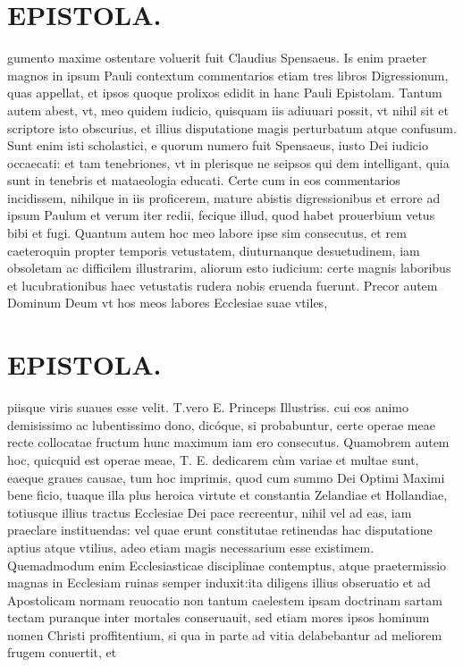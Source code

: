 \documentclass{article}
\begin{document}
\begin{pages}
\section*{EPISTOLA. }\pstart gumento maxime ostentare voluerit fuit Claudius Spensaeus. Is enim praeter magnos in ipsum Pauli contextum commentarios etiam tres libros Digressionum, quas appellat, et ipsos quoque prolixos edidit in hanc Pauli Epistolam. Tantum autem abest, vt, meo quidem iudicio, quisquam iis adiuuari possit, vt nihil sit et scriptore isto obscurius, et illius disputatione magis perturbatum atque confusum. Sunt enim isti scholastici, e quorum numero fuit Spensaeus, iusto Dei iudicio occaecati: et tam tenebriones, vt in plerisque ne seipsos qui dem intelligant, quia sunt in tenebris et mataeologia educati. Certe cum in eos commentarios incidissem, nihilque in iis proficerem, mature abistis digressionibus et errore ad ipsum Paulum et verum iter redii, fecique illud, quod habet prouerbium vetus bibi et fugi. Quantum autem hoc meo labore ipse sim consecutus, et rem caeteroquin propter temporis vetustatem, diuturnanque desuetudinem, iam obsoletam ac difficilem illustrarim, aliorum esto iudicium: certe magnis laboribus et lucubrationibus haec vetustatis rudera nobis eruenda fuerunt. Precor autem Dominum Deum vt hos meos labores Ecclesiae suae vtiles,  \pend
\section*{EPISTOLA. }\pstart piisque viris suaues esse velit. T.vero E. Princeps Illustriss. cui eos animo demisissimo ac lubentissimo dono, dicóque, si probabuntur, certe operae meae recte collocatae fructum hunc maximum iam ero consecutus. Quamobrem autem hoc, quicquid est operae meae, T. E. dedicarem cùm variae et multae sunt, eaeque graues causae, tum hoc imprimis, quod cum summo Dei Optimi Maximi bene ficio, tuaque illa plus heroica virtute et constantia Zelandiae et Hollandiae, totiusque illius tractus Ecclesiae Dei pace recreentur, nihil vel ad eas, iam praeclare instituendas: vel quae erunt constitutae retinendas hac disputatione aptius atque vtilius, adeo etiam magis necessarium esse existimem. Quemadmodum enim Ecclesiasticae disciplinae contemptus, atque praetermissio magnas in Ecclesiam ruinas semper induxit:ita diligens illius obseruatio et ad Apostolicam normam reuocatio non tantum caelestem ipsam doctrinam sartam tectam puranque inter mortales conseruauit, sed etiam mores ipsos hominum nomen Christi proffitentium, si qua in parte ad vitia delabebantur ad meliorem frugem conuertit, et  \pend

\end{pages}
\end{document}
